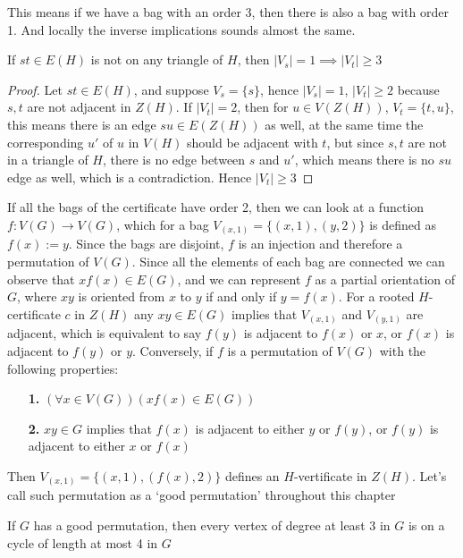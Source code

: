 This means if we have a bag with an order 3, then there is also a bag with order 1.
And locally the inverse implications sounds almost the same.

\begin{claim}
    \label{claim:first}
    If $st \in E(H)$ is not on any triangle of $H$, then $|V_{s}| = 1 \implies |V_{t}| \geq 3$ 
\end{claim}

\begin{proof}
    Let $st \in E(H)$, and suppose $V_{s} = \{s\}$, hence $|V_{s}| = 1$, $|V_{t}| \geq 2$ because $s, t$ are not adjacent in $Z(H)$.
    If $|V_{t}| = 2$, then for $u \in V(Z(H))$, $V_{t} = \{t, u\}$, this means there is an edge $su \in E(Z(H))$ as well, at the same time 
    the corresponding $u'$ of $u$ in $V(H)$ should be adjacent with $t$, but since $s, t$ are not in a triangle of $H$, there is no edge
    between $s$ and $u'$, which means there is no $su$ edge as well, which is a contradiction. Hence $|V_{t}| \geq 3$
\end{proof}

If all the bags of the certificate have order 2, then we can look at a function $f: V(G) \to V(G)$, which for a bag $V_{(x, 1)} = \{(x, 1), (y, 2)\}$ is defined as $f(x) := y$.
Since the bags are disjoint, $f$ is an injection and therefore a permutation of $V(G)$. Since all the elements of each bag are connected we can observe
that $xf(x) \in E(G)$, and we can represent $f$ as a partial orientation of $G$, where $xy$ is oriented from $x$ to $y$ if and only if $y = f(x)$. 
For a rooted $H$-certificate $c$ in $Z(H)$ any $xy \in E(G)$ implies that $V_{(x, 1)}$ and $V_{(y, 1)}$ are adjacent, which is equivalent to say
$f(y)$ is adjacent to $f(x)$ or $x$, or $f(x)$ is adjacent to $f(y)$ or $y$. Conversely, if $f$ is a permutation of $V(G)$ with the following properties:

\begin{itemize}
    \item [\textbf{1.}] $(\forall x \in V(G)) (xf(x) \in E(G))$ 
    \item [\textbf{2.}] $xy \in G$ implies that $f(x)$ is adjacent to either $y$ or $f(y)$, or $f(y)$ is adjacent to either $x$ or $f(x)$
\end{itemize}
Then $V_{(x, 1)} = \{(x, 1), (f(x), 2)\}$ defines an $H$-vertificate in $Z(H)$.
Let's call such permutation as a `good permutation' throughout this chapter

\begin{claim}
    \label{claim:second}
    If $G$ has a good permutation, then every vertex of degree at least 3 in $G$ is on a cycle of length at most 4 in $G$
\end{claim}

